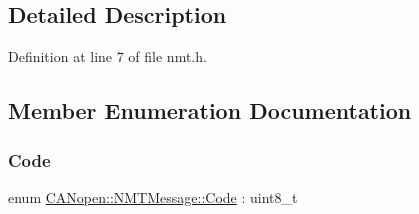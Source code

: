 \subsection{Detailed Description}


Definition at line 7 of file nmt.\+h.



\subsection{Member Enumeration Documentation}
\mbox{\label{class_c_a_nopen_1_1_n_m_t_message_a20257f9fc32b84adc9196fd436f15e95}} 
\subsubsection{\texorpdfstring{Code}{Code}}
{\footnotesize\ttfamily enum \hyperlink{class_c_a_nopen_1_1_n_m_t_message_a20257f9fc32b84adc9196fd436f15e95}{C\+A\+Nopen\+::\+N\+M\+T\+Message\+::\+Code} \+: uint8\+\_\+t}


